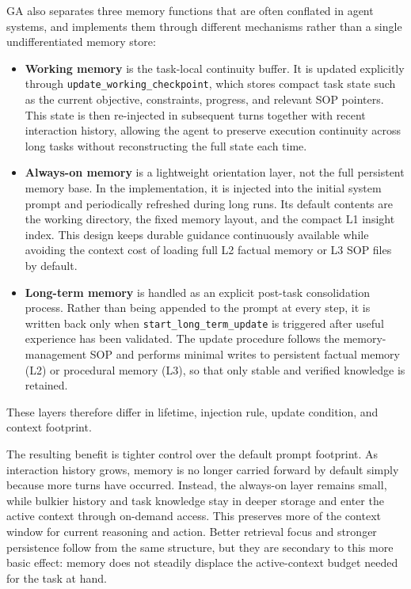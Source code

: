 GA also separates three memory functions that are often conflated in agent systems, and implements them through different mechanisms rather than a single undifferentiated memory store:
\begin{itemize}
    \item \textbf{Working memory} is the task-local continuity buffer. It is updated explicitly through \texttt{update\_working\_checkpoint}, which stores compact task state such as the current objective, constraints, progress, and relevant SOP pointers. This state is then re-injected in subsequent turns together with recent interaction history, allowing the agent to preserve execution continuity across long tasks without reconstructing the full state each time.

    \item \textbf{Always-on memory} is a lightweight orientation layer, not the full persistent memory base. In the implementation, it is injected into the initial system prompt and periodically refreshed during long runs. Its default contents are the working directory, the fixed memory layout, and the compact L1 insight index. This design keeps durable guidance continuously available while avoiding the context cost of loading full L2 factual memory or L3 SOP files by default.

    \item \textbf{Long-term memory} is handled as an explicit post-task consolidation process. Rather than being appended to the prompt at every step, it is written back only when \texttt{start\_long\_term\_update} is triggered after useful experience has been validated. The update procedure follows the memory-management SOP and performs minimal writes to persistent factual memory (L2) or procedural memory (L3), so that only stable and verified knowledge is retained.
\end{itemize}

These layers therefore differ in lifetime, injection rule, update condition, and context footprint.

The resulting benefit is tighter control over the default prompt footprint. As interaction history grows, memory is no longer carried forward by default simply because more turns have occurred. Instead, the always-on layer remains small, while bulkier history and task knowledge stay in deeper storage and enter the active context through on-demand access. This preserves more of the context window for current reasoning and action. Better retrieval focus and stronger persistence follow from the same structure, but they are secondary to this more basic effect: memory does not steadily displace the active-context budget needed for the task at hand.


